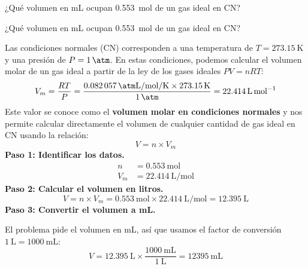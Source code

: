 \begin{exercise}
    ¿Qué volumen en mL ocupan \qty{0.553}{\mol} de un gas ideal en CN?
    \begin{solu}
        ¿Qué volumen en mL ocupan \qty{0.553}{\mol} de un gas ideal en CN?

        Las condiciones normales (CN) corresponden a una temperatura de $T = \qty{273.15}{\kelvin}$
        y una presión de $P = \qty{1}{\atm}$. En estas condiciones, podemos calcular el
        volumen molar de un gas ideal a partir de la ley de los gases ideales $PV = nRT$:
        \begin{equation*}
            V_m = \frac{RT}{P} = \frac{\qty{0.082057}{\atm\liter\per\mol\per\kelvin}
            \times \qty{273.15}{\kelvin}}{\qty{1}{\atm}} = \qty{22.414}{\liter\per\mol}
        \end{equation*}
        Este valor se conoce como el \textbf{volumen molar en condiciones normales} y nos permite
        calcular directamente el volumen de cualquier cantidad de gas ideal en CN usando la
        relación:
        \begin{equation*}
            V = n \times V_m
        \end{equation*}
        \textbf{Paso 1: Identificar los datos.}
        \begin{align*}
            n   &= \qty{0.553}{\mol} \\
            V_m &= \qty{22.414}{\liter\per\mol}
        \end{align*}
        \textbf{Paso 2: Calcular el volumen en litros.}
        \begin{equation*}
            V = n \times V_m = \qty{0.553}{\mol} \times \qty{22.414}{\liter\per\mol}
            = \qty{12.395}{\liter}
        \end{equation*}
        \textbf{Paso 3: Convertir el volumen a mL.}

        El problema pide el volumen en mL, así que usamos el factor de conversión
        $\qty{1}{\liter} = \qty{1000}{\mL}$:
        \begin{equation*}
            V = \qty{12.395}{\liter} \times \frac{\qty{1000}{\mL}}{\qty{1}{\liter}}
            = \boxed{\qty{12395}{\mL}}
        \end{equation*}
    \end{solu}
\end{exercise}
